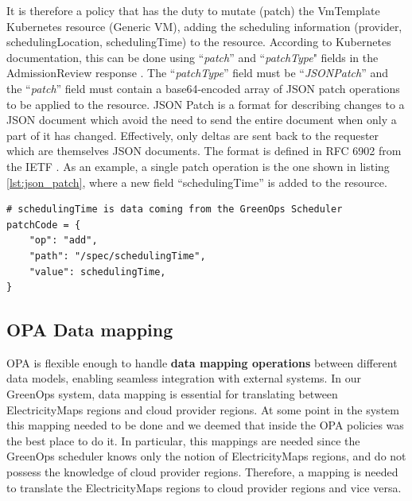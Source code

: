 It is therefore a policy that has the duty to mutate (patch) the VmTemplate Kubernetes resource (Generic VM), adding the scheduling information (provider, schedulingLocation, schedulingTime) to the resource.
According to Kubernetes documentation, this can be done using ``\textit{patch}'' and ``\textit{patchType}" fields in the AdmissionReview response \cite{kubernetes_dynamic_admission_control}.
The ``\textit{patchType}'' field must be ``\textit{JSONPatch}'' and the ``\textit{patch}'' field must contain a base64-encoded array of JSON patch operations to be applied to the resource.
JSON Patch is a format for describing changes to a JSON document which avoid the need to send the entire document when only a part of it has changed. 
Effectively, only deltas are sent back to the requester which are themselves JSON documents.
The format is defined in RFC 6902 from the IETF \cite{json_patch}.
As an example, a single patch operation is the one shown in listing \ref{lst:json_patch}, where a new field ``schedulingTime'' is added to the resource.

\begin{lstlisting}[language=rego, caption={JSON Patch example}, label={lst:json_patch}]
# schedulingTime is data coming from the GreenOps Scheduler
patchCode = {
	"op": "add",
	"path": "/spec/schedulingTime",
	"value": schedulingTime,
}
\end{lstlisting}

\subsection{OPA Data mapping}

OPA is flexible enough to handle \textbf{data mapping operations} between different data models, enabling seamless integration with external systems. 
In our GreenOps system, data mapping is essential for translating between ElectricityMaps regions and cloud provider regions. 
At some point in the system this mapping needed to be done and we deemed that inside the OPA policies was the best place to
do it.
In particular, this mappings are needed since the GreenOps scheduler knows only the notion of ElectricityMaps regions, and do not possess the knowledge of cloud provider regions. 
Therefore, a mapping is needed to translate the ElectricityMaps regions to cloud provider regions and vice versa.

